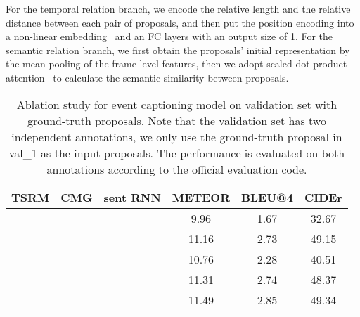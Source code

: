 \documentclass[10pt,twocolumn,letterpaper]{article}
\begin{document}
For the temporal relation branch, we encode the relative length and the relative distance between each pair of proposals, and then put the position encoding into a non-linear embedding~\cite{vaswani2017attention} and an FC layers with an output size of 1. For the semantic relation branch, we first obtain the proposals' initial representation by the mean pooling of the frame-level features, then we adopt scaled dot-product attention~\cite{vaswani2017attention} to calculate the semantic similarity between proposals.

\begin{table*}
	\begin{center}
		\begin{tabular}{ccc|ccc}
			\hline
			TSRM & CMG & sent RNN & \textbf{METEOR} & BLEU@4 & CIDEr\\
			\hline
			 &  &  & 9.96 & 1.67 &32.67\\
			  &  & &11.16 & 2.73 & 49.15 \\
			
			 &  &  & 10.76 & 2.28 & 40.51\\
 &  &  & 11.31 &2.74 &48.37\\
			  &  &  & 11.49 &2.85 &49.34\\
			\hline
		\end{tabular}
	\end{center}
	\caption{Ablation study for event captioning model on validation set with ground-truth proposals. Note that the validation set has two independent annotations, we only use the ground-truth proposal in val\_1 as the input proposals. The performance is evaluated on both annotations according to the official evaluation code.}
	\label{table:ablation}
\end{table*}
\end{document}
